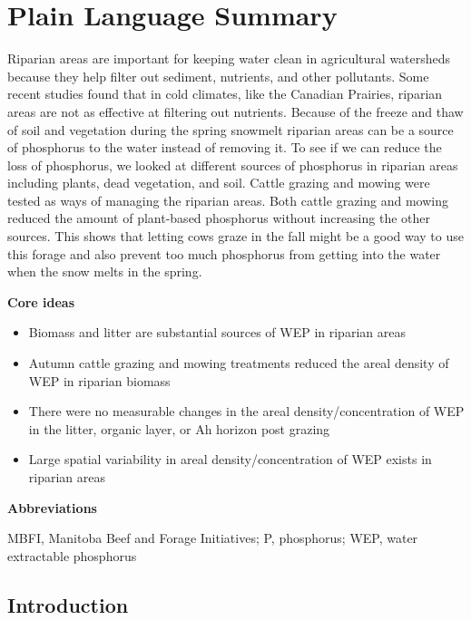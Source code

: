 \documentclass[
]{agujournal2019}
\providecommand{\tightlist}{%
  \setlength{\itemsep}{0pt}\setlength{\parskip}{0pt}}\usepackage{longtable,booktabs,array}
\begin{document}
\section*{Plain Language Summary}
Riparian areas are important for keeping water clean in agricultural
watersheds because they help filter out sediment, nutrients, and other
pollutants. Some recent studies found that in cold climates, like the
Canadian Prairies, riparian areas are not as effective at filtering out
nutrients. Because of the freeze and thaw of soil and vegetation during
the spring snowmelt riparian areas can be a source of phosphorus to the
water instead of removing it. To see if we can reduce the loss of
phosphorus, we looked at different sources of phosphorus in riparian
areas including plants, dead vegetation, and soil. Cattle grazing and
mowing were tested as ways of managing the riparian areas. Both cattle
grazing and mowing reduced the amount of plant-based phosphorus without
increasing the other sources. This shows that letting cows graze in the
fall might be a good way to use this forage and also prevent too much
phosphorus from getting into the water when the snow melts in the
spring.




\textbf{Core ideas}

\begin{itemize}
\tightlist
\item
  Biomass and litter are substantial sources of WEP in riparian areas
\item
  Autumn cattle grazing and mowing treatments reduced the areal density
  of WEP in riparian biomass
\item
  There were no measurable changes in the areal density/concentration of
  WEP in the litter, organic layer, or Ah horizon post grazing
\item
  Large spatial variability in areal density/concentration of WEP exists
  in riparian areas
\end{itemize}

\textbf{Abbreviations}

MBFI, Manitoba Beef and Forage Initiatives; P, phosphorus; WEP, water
extractable phosphorus

\subsection{Introduction}\label{introduction}
\end{document}
